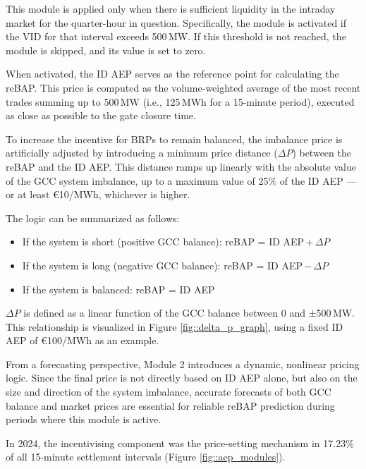 \documentclass[class=scrbook, crop=false]{standalone}
\begin{document}
This module is applied only when there is sufficient liquidity in the intraday market for the quarter-hour in question. Specifically, the module is activated if the \gls{VID} for that interval exceeds 500 MW. If this threshold is not reached, the module is skipped, and its value is set to zero.

When activated, the \gls{ID AEP} serves as the reference point for calculating the \gls{reBAP}. This price is computed as the volume-weighted average of the most recent trades summing up to 500 MW (i.e., 125 MWh for a 15-minute period), executed as close as possible to the gate closure time.

To increase the incentive for \gls{BRP}s to remain balanced, the imbalance price is artificially adjusted by introducing a minimum price distance ($\Delta P$) between the \gls{reBAP} and the \gls{ID AEP}. This distance ramps up linearly with the absolute value of the \gls{GCC} system imbalance, up to a maximum value of 25\% of the \gls{ID AEP} — or at least €10/MWh, whichever is higher.

The logic can be summarized as follows:
\begin{itemize}
\item If the system is short (positive GCC balance):
 reBAP = ID AEP + $\Delta P$
\item If the system is long (negative GCC balance):
 reBAP = ID AEP − $\Delta P$
\item If the system is balanced:
 reBAP = ID AEP
\end{itemize}

$\Delta P$ is defined as a linear function of the GCC balance between 0 and ±500 MW. This relationship is visualized in Figure \ref{fig::delta_p_graph}, using a fixed ID AEP of €100/MWh as an example. 

From a forecasting perspective, Module 2 introduces a dynamic, nonlinear pricing logic. 
Since the final price is not directly based on \gls{ID AEP} alone, but also on the size and direction of the system imbalance, accurate forecasts of both \gls{GCC} balance and market prices are essential for reliable reBAP prediction during periods where this module is active.

In 2024, the incentivising component was the price-setting mechanism in 17.23\% of all 15-minute settlement intervals (Figure \ref{fig::aep_modules}). 
\end{document}

